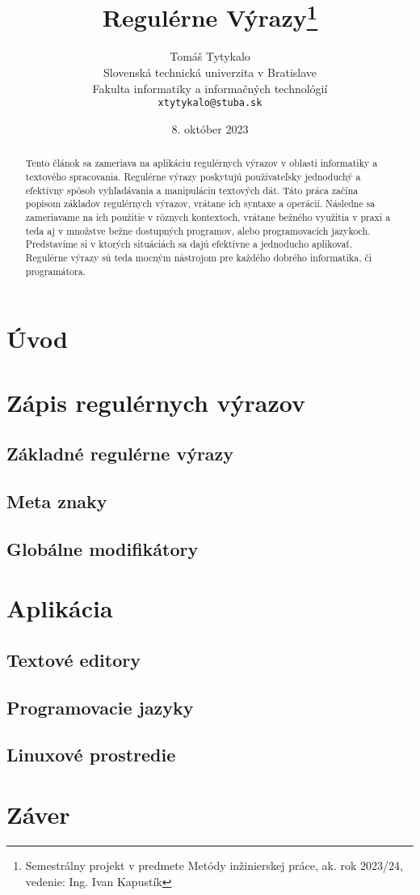 \documentclass[10pt,twoside,slovak,a4paper]{article}
\title{Regulérne Výrazy\thanks{Semestrálny projekt v predmete Metódy inžinierskej práce, ak. rok 2023/24, vedenie: Ing. Ivan Kapustík}} %
\author{Tomáš Tytykalo\\[2pt]
	{\small Slovenská technická univerzita v Bratislave}\\
	{\small Fakulta informatiky a informačných technológií}\\
	{\small \texttt{xtytykalo@stuba.sk}}
	}
\date{\small 8. október 2023} %
\begin{document}
\maketitle

\begin{abstract}

Tento článok sa zameriava na aplikáciu regulérnych výrazov v oblasti informatiky a textového spracovania. Regulérne výrazy poskytujú používateľsky jednoduchý a efektívny spôsob vyhľadávania a manipuláciu textových dát. Táto práca začína popisom základov regulérnych výrazov, vrátane ich syntaxe a operácií. Následne sa zameriavame na ich použitie v rôznych kontextoch, vrátane bežného využitia v praxi a teda aj v množstve bežne dostupných programov, alebo programovacích jazykoch. Predstavíme si v ktorých situáciách sa dajú efektívne a jednoducho aplikovať. Regulérne výrazy sú teda mocným nástrojom pre každého dobrého informatika, či programátora.

\end{abstract}

\section{Úvod}

\section{Zápis regulérnych výrazov}
\cite{Sanjiv}
\subsection{Základné regulérne výrazy}
\subsection{Meta znaky}
\subsection{Globálne modifikátory}

\section{Aplikácia}
\cite{Bioperl}
\subsection{Textové editory}
\subsection{Programovacie jazyky}
\subsection{Linuxové prostredie}

\section{Záver}



\end{document}
